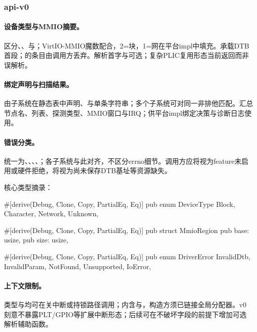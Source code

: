 
\subsubsection{api-v0}

\paragraph{设备类型与MMIO摘要。}区分、、与；VirtIO-MMIO魔数配合，2=块，1=网在平台impl中填充。承载DTB首段；的条目由调用方丢弃。解析首字与可选；复杂PLIC复用形态当前返回而非误解析。

\paragraph{绑定声明与扫描结果。}由子系统在静态表中声明、与单条字符串；多个子系统可对同一非排他匹配。汇总节点名、列表、探测类型、MMIO窗口与IRQ；供平台impl绑定决策与诊断日志使用。

\paragraph{错误分类。}统一为、、、、；各子系统与此对齐，不区分errno细节。调用方应将视为feature未启用或硬件拒绝，将视为尚未保存DTB基址等资源缺失。

核心类型摘录：

\begin{rustcode}
#[derive(Debug, Clone, Copy, PartialEq, Eq)]
pub enum DeviceType {
    Block,
    Character,
    Network,
    Unknown,
}

#[derive(Debug, Clone, Copy, PartialEq, Eq)]
pub struct MmioRegion {
    pub base: usize,
    pub size: usize,
}

#[derive(Debug, Clone, Copy, PartialEq, Eq)]
pub enum DriverError {
    InvalidDtb,
    InvalidParam,
    NotFound,
    Unsupported,
    IoError,
}
\end{rustcode}

\paragraph{上下文限制。}类型与均可在关中断或持锁路径调用；内含与，构造方须已链接全局分配器。v0刻意不暴露PLT/GPIO等扩展中断形态；后续可在不破坏字段的前提下增加可选解析辅助函数。

